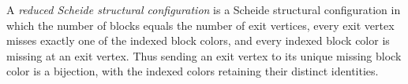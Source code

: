 \begin{definition}
A \emph{reduced Scheide structural configuration} is a Scheide structural
configuration in which the number of blocks equals the number of exit
vertices, every exit vertex misses exactly one of the indexed block colors,
and every indexed block color is missing at an exit vertex.  Thus sending an
exit vertex to its unique missing block color is a bijection, with the
indexed colors retaining their distinct identities.
\end{definition}
